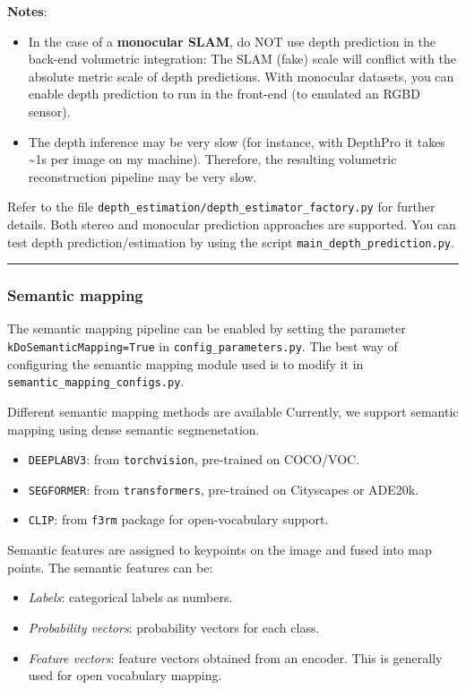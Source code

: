 \documentclass{article}
\begin{document}
\textbf{Notes}: 
\begin{itemize}
\item In the case of a \textbf{monocular SLAM}, do NOT use
depth prediction in the back-end volumetric integration: The SLAM (fake)
scale will conflict with the absolute metric scale of depth predictions.
With monocular datasets, you can enable depth prediction to run in the
front-end (to emulated an RGBD sensor). 
\item The depth inference may be
very slow (for instance, with DepthPro it takes \textasciitilde{}1s per
image on my machine). Therefore, the resulting volumetric reconstruction
pipeline may be very slow.
\end{itemize}

Refer to the file
\texttt{depth\_estimation/depth\_estimator\_factory.py} for further
details. Both stereo and monocular prediction approaches are supported.
You can test depth prediction/estimation by using the script
\texttt{main\_depth\_prediction.py}.

\begin{center}\rule{0.5\linewidth}{0.5pt}\end{center}

\hypertarget{semantic-mapping}{%
\subsubsection{Semantic mapping}\label{semantic-mapping}}

The semantic mapping pipeline can be enabled by setting the parameter
\texttt{kDoSemanticMapping=True} in \texttt{config\_parameters.py}. The
best way of configuring the semantic mapping module used is to modify it
in \texttt{semantic\_mapping\_configs.py}.

Different semantic mapping methods are available Currently, we support semantic mapping using dense
semantic segmenetation. 
\begin{itemize}
\item \texttt{DEEPLABV3}: from \texttt{torchvision}, pre-trained on COCO/VOC.
\item \texttt{SEGFORMER}: from \texttt{transformers}, pre-trained on Cityscapes or ADE20k.
\item \texttt{CLIP}: from \texttt{f3rm} package for open-vocabulary support.
\end{itemize}
Semantic features are assigned to keypoints on
the image and fused into map points. The semantic features can be: 
\begin{itemize}
\item \textit{Labels}: categorical labels as numbers.
\item \textit{Probability vectors}: probability vectors for each class.
\item \textit{Feature vectors}: feature vectors
obtained from an encoder. This is generally used for open vocabulary
mapping.
\end{itemize}
\end{document}
